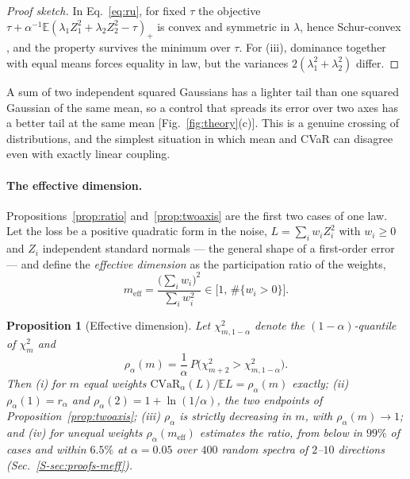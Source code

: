 \documentclass[aps,pra,twocolumn,superscriptaddress,reprint,nofootinbib,floatfix]{revtex4-2}
\newtheorem{proposition}{Proposition}
\theoremstyle{definition}
\newcommand{\cvar}{\mathrm{CVaR}}
\newcommand{\E}{\mathbb{E}}
\newcommand{\sref}[1]{Sec.~\ref{S-#1}}
\begin{document}
\begin{proof}[Proof sketch]
In Eq.~\eqref{eq:ru}, for fixed $\tau$ the objective
$\tau+\alpha^{-1}\E(\lambda_1Z_1^2+\lambda_2Z_2^2-\tau)_+$ is convex and
symmetric in $\lambda$, hence Schur-convex \cite{Marshall2011}, and the
property survives the minimum over $\tau$. For (iii), dominance together
with equal means forces equality in law, but the variances
$2(\lambda_1^2+\lambda_2^2)$ differ.
\end{proof}

A sum of two independent squared Gaussians has a lighter tail than one
squared Gaussian of the same mean, so a control that spreads its error over
two axes has a better tail at the same mean [Fig.~\ref{fig:theory}(c)]. This
is a genuine crossing of distributions, and the simplest situation in which
mean and CVaR can disagree even with exactly linear coupling.

\paragraph*{The effective dimension.} Propositions~\ref{prop:ratio}
and~\ref{prop:twoaxis} are the first two cases of one law. Let the loss be a
positive quadratic form in the noise, $L=\sum_iw_iZ_i^2$ with $w_i\ge0$ and
$Z_i$ independent standard normals --- the general shape of a first-order
error --- and define the \emph{effective dimension} as the participation ratio
of the weights,
\begin{equation}
m_{\mathrm{eff}}=\frac{\big(\sum_iw_i\big)^2}{\sum_iw_i^2}\in\big[1,\,\#\{w_i>0\}\big].
\label{eq:meff}
\end{equation}

\begin{proposition}[Effective dimension]
\label{prop:meff}
Let $\chi^2_{m,1-\alpha}$ denote the $(1-\alpha)$-quantile of $\chi^2_m$ and
\begin{equation}
\rho_\alpha(m)=\frac1\alpha\,P\!\big(\chi^2_{m+2}>\chi^2_{m,1-\alpha}\big).
\label{eq:rhoeff}
\end{equation}
Then (i) for $m$ equal weights $\cvar_\alpha(L)/\E L=\rho_\alpha(m)$ exactly;
(ii) $\rho_\alpha(1)=r_\alpha$ and $\rho_\alpha(2)=1+\ln(1/\alpha)$, the two
endpoints of Proposition~\ref{prop:twoaxis}; (iii) $\rho_\alpha$ is strictly
decreasing in $m$, with $\rho_\alpha(m)\to1$; and (iv) for unequal weights
$\rho_\alpha(m_{\mathrm{eff}})$ estimates the ratio, from below in $99\%$ of
cases and within $6.5\%$ at $\alpha=0.05$ over $400$ random spectra of $2$--$10$
directions (\sref{sec:proofs-meff}).
\end{proposition}
\end{document}
